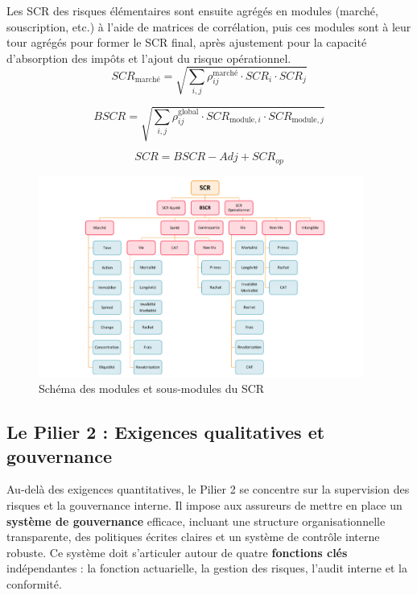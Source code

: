 \bigskip

Les SCR des risques élémentaires sont ensuite agrégés en modules (marché, souscription, etc.) à l'aide de matrices de corrélation, puis ces modules sont à leur tour agrégés pour former le SCR final, après ajustement pour la capacité d'absorption des impôts et l'ajout du risque opérationnel.
\begin{equation}
    SCR_{\text{marché}} = \sqrt{\sum_{i,j} \rho_{ij}^{\text{marché}} \cdot SCR_i \cdot SCR_j}
\end{equation}

\bigskip

\begin{equation}
    BSCR = \sqrt{\sum_{i,j} \rho_{ij}^{\text{global}} \cdot SCR_{\text{module}, i} \cdot SCR_{\text{module}, j}}
\end{equation}

\bigskip

\begin{equation}
    SCR = BSCR - Adj + SCR_{op}
\end{equation}

\bigskip

\begin{figure}[H]
    \centering
    \includegraphics[width=0.95\textwidth]{images/pieuvre_scr.png}
    \caption{Schéma des modules et sous-modules du SCR}
    \label{fig:pieuvre_scr}
\end{figure}

\subsection{Le Pilier 2 : Exigences qualitatives et gouvernance}

Au-delà des exigences quantitatives, le Pilier 2 se concentre sur la supervision des risques et la gouvernance interne. Il impose aux assureurs de mettre en place un \textbf{système de gouvernance} efficace, incluant une structure organisationnelle transparente, des politiques écrites claires et un système de contrôle interne robuste. Ce système doit s'articuler autour de quatre \textbf{fonctions clés} indépendantes : la fonction actuarielle, la gestion des risques, l'audit interne et la conformité.

